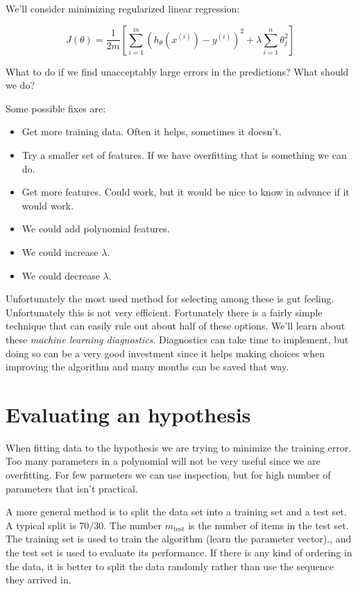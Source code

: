 \documentclass[a4, 12pt, english, USenglish]{scrreprt}
\newcommand{\brackets}[1]{\ensuremath{\left[{#1}\right]}}
\newcommand{\parens}[1]{\ensuremath{\left({#1}\right)}}
\newcommand{\idx}[1]{{\em #1}\index{#1}}
\begin{document}
We'll consider minimizing regularized linear regression:

\[
 J(\theta) = \frac{1}{2m} \brackets{\sum_{i=1}^m \parens{h_\theta(x^{(i)}) -
   y^{(i)}}^2  + \lambda \sum_{i=1}^n \theta_j^2}
\]


What to do if we find unacceptably large errors in the predictions?
What should we do?

Some possible fixes are:


\begin{itemize}
\item Get more training data.  Often it helps, sometimes it doesn't.
\item Try a smaller set of features. If we have overfitting that is
  something we can do.
\item Get more features.  Could work, but it would be nice to know in
  advance if it would work.
\item We could add polynomial features.
\item We could increase \(\lambda\).
\item We could decrease \(\lambda\).
\end{itemize}

Unfortunately the most used method for selecting among these is gut
feeling.  Unfortunately this is not very efficient.  Fortunately there
is a fairly simple technique that can easily rule out about half of
these options.   We'll learn about these \idx{machine learning
  diagnostics}.  Diagnostics can take time to implement, but doing so
can be a very good investment since it helps making choices when
improving the algorithm and many months can be saved that way.

\section{Evaluating an hypothesis}

When fitting data to the hypothesis we are trying to minimize the
training error.   Too many parameters in a polynomial will not be very
useful since we are overfitting.  For few parmeters we can use
inspection, but for high number of parameters that isn't practical.

A more general method is to split the data set into a training set and
a test set. A typical split is 70/30.  The number \(m_{\mbox{test}}\)
is the number of items in the test set. The training set is used to
train the algorithm (learn the parameter vector)., and the test set is
used to evaluate its performance.  If there is any kind of ordering in
the data, it is better to split the data randomly rather than use the
sequence they arrived in.
\end{document}
